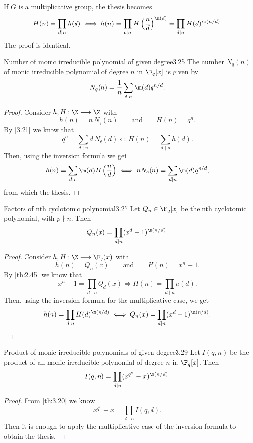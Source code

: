 \begin{oss}
	If \(G\) is a multiplicative group, the thesis becomes
	\[
		H(n) = \prod_{d \mid n}h(d) \iff h(n) = \prod_{d \mid n}H\left(\frac{n}{d}\right)^{\m(d)} = \prod_{d\mid n}H(d)^{\m(n/d)}.
	\]
	The proof is identical.
\end{oss}

\begin{teor}{Number of monic irreducible polynomial of given degree}{3.25}
	The number \(N_q(n)\) of monic irreducible polynomial of degree \(n\) in \(\F_q[x]\) is given by
	\[
		N_q(n) = \frac{1}{n}\sum_{d\mid n}\m(d)q^{n/d}.
	\]
\end{teor}

\begin{proof}
	Consider \(h,H\colon \Z \longrightarrow \Z\) with
	\[
		h(n) = n\,N_q(n) \qquad\text{and}\qquad H(n) = q^n.
	\]
	By \autoref{3.21} we know that
	\[
		q^n = \sum_{d\mid n} d\,N_q(d) \iff H(n) = \sum_{d\mid n} h(d).
	\]
	Then, using the inversion formula we get
	\[
		h(n) = \sum_{d\mid n}\m(d)H\left(\frac{n}{d}\right) \iff n N_q(n) = \sum_{d\mid n}\m(d)q^{n/d},
	\]
	from which the thesis.
\end{proof}

\begin{teor}{Factors of nth cyclotomic polynomial}{3.27}
	Let \(Q_n\in\F_q[x]\) be the nth cyclotomic polynomial, with \(p\nmid n\). Then
	\[
		Q_n(x) = \prod_{d\mid n}(x^d-1)^{\m(n/d)}.
	\]
\end{teor}

\begin{proof}
	Consider \(h,H\colon \Z \longrightarrow \F_q(x)\) with
	\[
		h(n) = Q_n(x) \qquad\text{and}\qquad H(n) = x^n-1.
	\]
	By \autoref{th:2.45} we know that
	\[
		x^n-1 = \prod_{d \mid n} Q_d(x) \iff H(n) = \prod_{d \mid n}h(d).
	\]
	Then, using the inversion formula for the multiplicative case, we get
	\[
		h(n) = \prod_{d\mid n} H(d)^{\m(n/d)} \iff Q_n(x) = \prod_{d \mid n} (x^d-1)^{\m(n/d)}.\qedhere
	\]
\end{proof}

\begin{teor}{Product of monic irreducible polynomials of given degree}{3.29}
	Let \(I(q,n)\) be the product of all monic irreducible polynomial of degree \(n\) in \(\F_q[x]\). Then
	\[
		I(q,n) = \prod_{d\mid n}(x^{q^d}-x)^{\m(n/d)}.
	\]
\end{teor}

\begin{proof}
	From \autoref{th:3.20} we know
	\[
		x^{q^n}-x = \prod_{d\mid n}I(q,d).
	\]
	Then it is enough to apply the multiplicative case of the inversion formula to obtain the thesis.
\end{proof}

